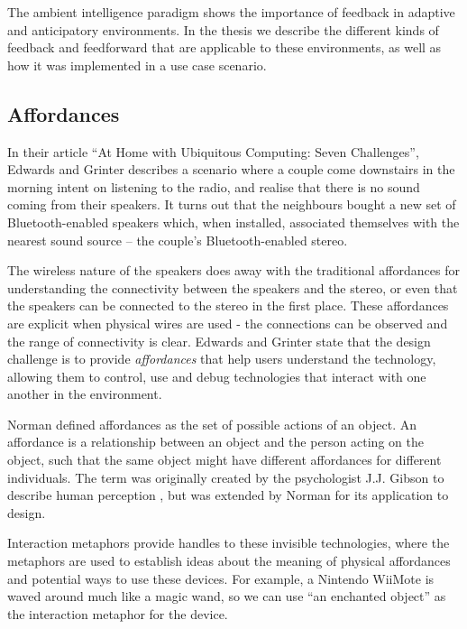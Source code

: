 The ambient intelligence paradigm shows the importance of feedback in adaptive and anticipatory environments. In the thesis we describe the different kinds of feedback and feedforward that are applicable to these environments, as well as how it was implemented in a use case scenario. 


\subsection{Affordances}

In their article ``At Home with Ubiquitous Computing: Seven Challenges'', Edwards and Grinter \cite{Edwards2001} describes a scenario where a couple come downstairs in the morning intent on listening to the radio, and realise that there is no sound coming from their speakers. It turns out that the neighbours bought a new set of Bluetooth-enabled speakers which, when installed, associated themselves with the nearest sound source -- the couple's Bluetooth-enabled stereo.

The wireless nature of the speakers does away with the traditional affordances for understanding the connectivity between the speakers and the stereo, or even that the speakers can be connected to the stereo in the first place. These affordances are explicit when physical wires are used - the connections can be observed and the range of connectivity is clear. Edwards and Grinter state that the design challenge is to provide \emph{affordances}\label{Affordances} that help users understand the technology, allowing them to control, use and debug technologies that interact with one another in the environment. 

Norman \cite{Norman1999} defined affordances as the set of possible actions of an object. An affordance is a relationship between an object and the person acting on the object, such that the same object might have different affordances for different individuals. The term was originally created by the psychologist J.J. Gibson to describe human perception \cite{Gibson1977}, but was extended by Norman for its application to design.


Interaction metaphors \cite{Kuniavsky} provide handles to these invisible technologies, where the metaphors are used to establish ideas about the meaning of physical affordances and potential ways to use these devices. For example, a Nintendo WiiMote is waved around much like a magic wand, so we can use ``an enchanted object'' as the interaction metaphor for the device.

